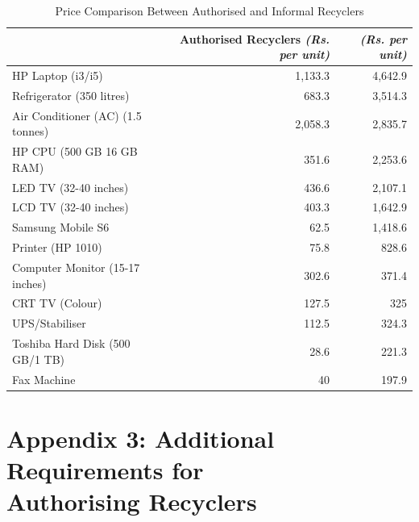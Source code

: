 \documentclass[a4paper, 12pt]{article}
\begin{document}
\begin{table}[htpb]
\raggedright 
\caption{Price Comparison Between Authorised and Informal Recyclers}
\begin{tabular}{ l  r  r }
\toprule
 \multicolumn{1}{p{7em}}{\centering{Item}} & \multicolumn{1}{p{10em}}{Authorised Recyclers \raggedleft\footnotesize\textit{(Rs. per unit)}} & \multicolumn{1}{p{9.5em}}{\centering{Informal Recyclers} \raggedleft\footnotesize\textit{(Rs. per unit)}} \\
\midrule

HP Laptop (i3/i5) & 1,133.3 & 4,642.9\\
Refrigerator (350 litres) & 683.3 & 3,514.3 \\
Air Conditioner (AC) (1.5 tonnes) & 2,058.3 & 2,835.7 \\
HP CPU (500 GB 16 GB RAM) & 351.6  & 2,253.6 \\
LED TV (32-40 inches) & 436.6 & 2,107.1 \\
LCD TV (32-40 inches) & 403.3 & 1,642.9 \\
Samsung Mobile S6 & 62.5 & 1,418.6 \\
Printer (HP 1010) & 75.8 & 828.6 \\
Computer Monitor (15-17 inches) & 302.6 & 371.4\\
CRT TV (Colour) & 127.5 & 325 \\
UPS/Stabiliser & 112.5 & 324.3 \\
Toshiba Hard Disk (500 GB/1 TB) & 28.6 & 221.3 \\
Fax Machine & 40  & 197.9 \\ 
\bottomrule
\end{tabular}
\end{table}


\newpage
\section*{Appendix 3: Additional Requirements for \\ Authorising Recyclers}
        
\end{document}
